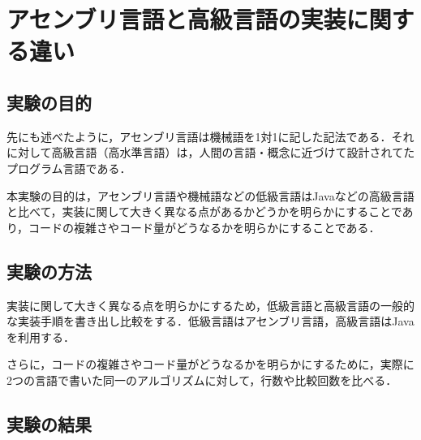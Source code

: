 \section{アセンブリ言語と高級言語の実装に関する違い}
\subsection{実験の目的}
先にも述べたように，アセンブリ言語は機械語を1対1に記した記法である．それに対して高級言語（高水準言語）は，人間の言語・概念に近づけて設計されてたプログラム言語である．\cite{高水準言語}\par
本実験の目的は，アセンブリ言語や機械語などの低級言語は{\ttfamily Java}などの高級言語と比べて，実装に関して大きく異なる点があるかどうかを明らかにすることであり，コードの複雑さやコード量がどうなるかを明らかにすることである．
\subsection{実験の方法}
実装に関して大きく異なる点を明らかにするため，低級言語と高級言語の一般的な実装手順を書き出し比較をする．低級言語はアセンブリ言語，高級言語は{\ttfamily Java}を利用する．\par
さらに，コードの複雑さやコード量がどうなるかを明らかにするために，実際に2つの言語で書いた同一のアルゴリズムに対して，行数や比較回数を比べる．
\subsection{実験の結果}
